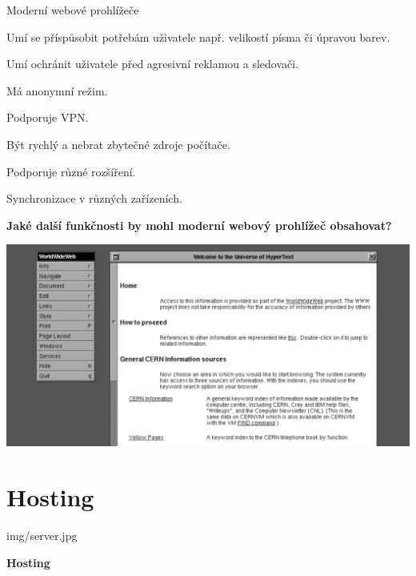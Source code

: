\documentclass[aspectratio=169]{beamer}
\begin{document}
\begin{frame}{Moderní webové prohlížeče}
    \begin{cardTiny}
        \begin{flushleft}
            Umí se příspůsobit potřebám uživatele např. velikostí písma či úpravou barev.

            Umí ochránit uživatele před agresivní reklamou a sledovači.

            Má anonymní režim.

            Podporuje VPN.

            Být rychlý a nebrat zbytečné zdroje počítače.

            Podporuje různé rozšíření.

            Synchronizace v různých zařízeních.
        \end{flushleft}
    \end{cardTiny}
    \begin{cardTiny}
        \begin{center}
            \textbf{Jaké další funkčnosti by mohl moderní webový prohlížeč obsahovat?}
        \end{center}
    \end{cardTiny}
\end{frame}

\begin{frame}
    \includegraphics[width=\textwidth]{img/www-1991.png}
\end{frame}




\section{Hosting}

\begin{frameImg}[width]{img/server.jpg}
    \vspace*{60mm}
    \begin{cardTiny}
        \vspace*{\fill}
        \begin{center}
            \textbf{Hosting}
        \end{center}
    \end{cardTiny}
\end{frameImg}
\end{document}
